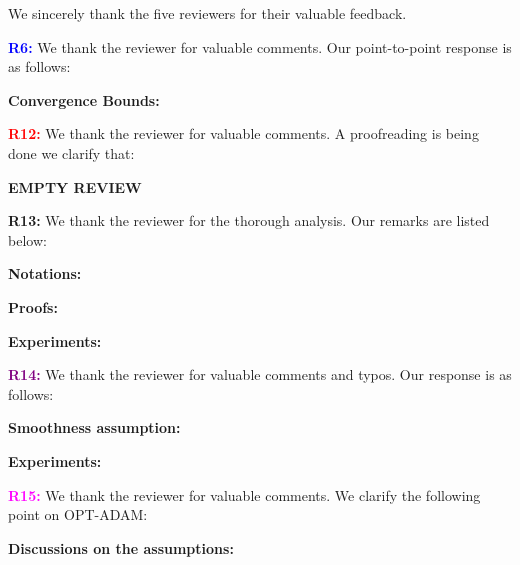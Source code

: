 \documentclass{article}
\begin{document}
We sincerely thank the five reviewers for their valuable feedback.


\vspace{0.01in}

\textbf{\textcolor{blue}{R6:}} We thank the reviewer for valuable comments. Our point-to-point response is as follows:\vspace{-5pt}


\textbf{Convergence Bounds:} 


\vspace{0.01in}


\textbf{\textcolor{red}{R12:}} We thank the reviewer for valuable comments. A proofreading is being done we clarify that:\vspace{-5pt}

\textbf{EMPTY REVIEW} 


\vspace{0.01in}
\textbf{\textcolor{green!50!black}{R13:}} We thank the reviewer for the thorough analysis. Our remarks are listed below:\vspace{-5pt}

\textbf{Notations:} 

\textbf{Proofs:} 

\textbf{Experiments:} 


\vspace{0.01in}

\textbf{\textcolor{purple}{R14:}} We thank the reviewer for valuable comments and typos. Our response is as follows:\vspace{-5pt}

\textbf{Smoothness assumption:} 

\textbf{Experiments:} 


\vspace{0.01in}

\textbf{\textcolor{magenta}{R15:}} We thank the reviewer for valuable comments. We clarify the following point on OPT-ADAM:\vspace{-5pt}

\textbf{Discussions on the assumptions:} 
\end{document}
